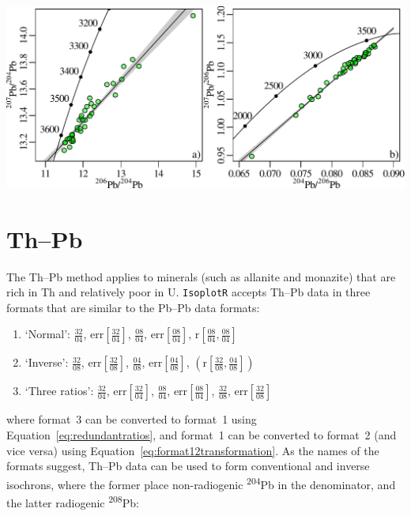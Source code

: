 \begin{refsection}
\begin{center}
\noindent\includegraphics[width=.8\linewidth]{../figures/Kamber.pdf}
\label{fig:Kamber}
\end{center}

\section{Th--Pb}\label{sec:ThPb}

The Th--Pb method applies to minerals (such as allanite and monazite)
that are rich in Th and relatively poor in U. \texttt{IsoplotR}
accepts Th--Pb data in three formats that are similar to the Pb--Pb
data formats:

\begin{enumerate}
\item{`Normal':}
  $\frac{32}{04}$,  
  $\mbox{err}\!\left[\frac{32}{04}\right]$, 
  $\frac{08}{04}$,  
  $\mbox{err}\!\left[\frac{08}{04}\right]$,  
  $\mbox{r}\!\left[\frac{08}{04},\frac{08}{04}\right]$
\item{`Inverse':}
  $\frac{32}{08}$,  
  $\mbox{err}\!\left[\frac{32}{08}\right]$, 
  $\frac{04}{08}$,  
  $\mbox{err}\!\left[\frac{04}{08}\right]$, 
  $\left(\mbox{r}\!\left[\frac{32}{08},\frac{04}{08}\right]\right)$
\item{`Three ratios':}
  $\frac{32}{04}$,  
  $\mbox{err}\!\left[\frac{32}{04}\right]$, 
  $\frac{08}{04}$,  
  $\mbox{err}\!\left[\frac{08}{04}\right]$,  
  $\frac{32}{08}$,  
  $\mbox{err}\!\left[\frac{32}{08}\right]$
\end{enumerate}

\noindent where format~3 can be converted to format~1 using
Equation~\ref{eq:redundantratios}, and format~1 can be converted to
format~2 (and vice versa) using
Equation~\ref{eq:format12transformation}. As the names of the formats
suggest, Th--Pb data can be used to form conventional and inverse
isochrons, where the former place non-radiogenic
\textsuperscript{204}Pb in the denominator, and the latter radiogenic
\textsuperscript{208}Pb:


\end{refsection}
